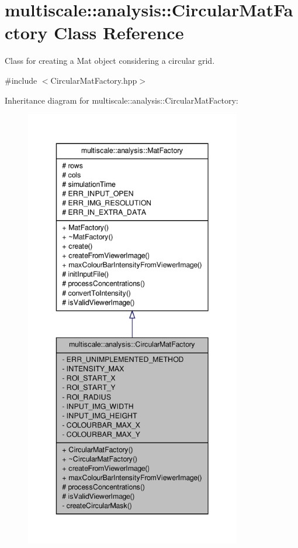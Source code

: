 \hypertarget{classmultiscale_1_1analysis_1_1CircularMatFactory}{\section{multiscale\-:\-:analysis\-:\-:\-Circular\-Mat\-Factory \-Class \-Reference}
\label{classmultiscale_1_1analysis_1_1CircularMatFactory}
}


\-Class for creating a \-Mat object considering a circular grid.  




{\ttfamily \#include $<$\-Circular\-Mat\-Factory.\-hpp$>$}



\-Inheritance diagram for multiscale\-:\-:analysis\-:\-:\-Circular\-Mat\-Factory\-:
\nopagebreak
\begin{figure}[H]
\begin{center}
\leavevmode
\includegraphics[height=550pt]{classmultiscale_1_1analysis_1_1CircularMatFactory__inherit__graph}
\end{center}
\end{figure}


